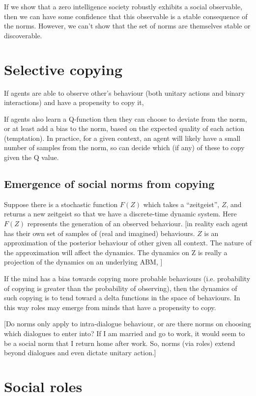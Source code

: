 \documentclass[a4paper]{article}
\begin{document}
If we show that a zero intelligence society robustly exhibits a social observable, then we can have some confidence that this observable is a stable consequence of the norms. However, we can't show that the set of norms are themselves stable or discoverable.

\section{Selective copying}

If agents are able to observe other's behaviour (both unitary actions and binary interactions) and have a propensity to copy it, 

If agents also learn a Q-function then they can choose to deviate from the norm, or at least add a bias to the norm, based on the expected quality of each action (temptation). In practice, for a given context, an agent will likely have a small number of samples from the norm, so can decide which (if any) of these to copy given the Q value.

\subsection{Emergence of social norms from copying}

Suppose there is a stochastic function $F(Z)$ which takes a ``zeitgeist'', $Z$, and returns a new zeitgeist so that we have a discrete-time dynamic system. Here $F(Z)$ represents the generation of an observed behaviour.  [in reality each agent has their own set of samples of (real and imagined) behaviours. $Z$ is an approximation of the posterior behaviour of other given all context. The nature of the approximation will affect the dynamics. The dynamics on Z is really a projection of the dynamics on an underlying ABM, ]

If the mind has a bias towards copying more probable behaviours (i.e. probability of copying is greater than the probability of observing), then the dynamics of such copying is to tend toward a delta functions in the space of behaviours. In this way roles may emerge from minds that have a propensity to copy.

[Do norms only apply to intra-dialogue behaviour, or are there norms on choosing which dialogues to enter into? If I am married and go to work, it would seem to be a social norm that I return home after work. So, norms (via roles) extend beyond dialogues and even dictate unitary action.]

\section{Social roles}
\end{document}
